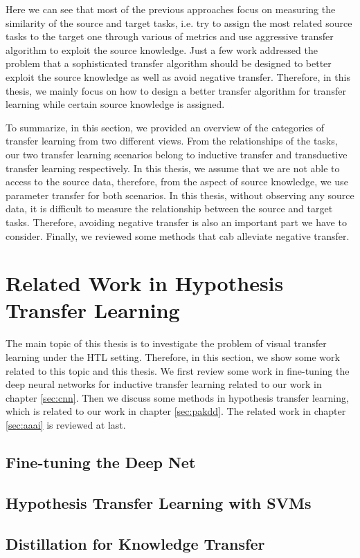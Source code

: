 Here we can see that most of the previous approaches focus on measuring the similarity of the source and target tasks, i.e. try to assign the most related source tasks to the target one through various of metrics and use aggressive transfer algorithm to exploit the source knowledge. Just a few work \cite{kuzborskij2013stability} \cite{tommasi2010safety} addressed the problem that a sophisticated transfer algorithm should be designed to better exploit the source knowledge as well as avoid negative transfer. Therefore, in this thesis, we mainly focus on how to design a better transfer algorithm for transfer learning while certain source knowledge is assigned. 

To summarize, in this section, we provided an overview of the categories of transfer learning from two different views. From the relationships of the tasks, our two transfer learning scenarios belong to inductive transfer and transductive transfer learning respectively. In this thesis, we assume that we are not able to access to the source data, therefore, from the aspect of source knowledge, we use parameter transfer for both scenarios. In this thesis, without observing any source data, it is difficult to measure the relationship between the source and target tasks. Therefore, avoiding negative transfer is also an important part we have to consider. Finally, we reviewed some methods that cab alleviate negative transfer.

\section{Related Work in Hypothesis Transfer Learning}
The main topic of this thesis is to investigate the problem of visual transfer learning under the HTL setting. Therefore, in this section, we show some work related to this topic and this thesis. We first review some work in fine-tuning the deep neural networks for inductive transfer learning related to our work in chapter \ref{sec:cnn}. Then we discuss some methods in hypothesis transfer learning, which is related to our work in chapter \ref{sec:pakdd}. The related work in chapter \ref{sec:aaai} is reviewed at last.

\subsection{Fine-tuning the Deep Net}


\subsection{Hypothesis Transfer Learning with SVMs}


\subsection{Distillation for Knowledge Transfer}




